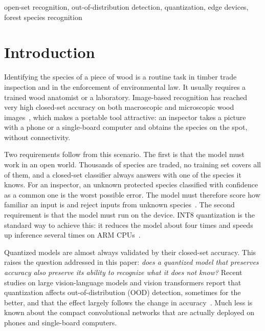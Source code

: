 \documentclass[conference]{IEEEtran}
\begin{document}
\begin{IEEEkeywords}
open-set recognition, out-of-distribution detection, quantization, edge devices, forest species recognition
\end{IEEEkeywords}

\section{Introduction}

Identifying the species of a piece of wood is a routine task in timber trade inspection and in the enforcement of environmental law. It usually requires a trained wood anatomist or a laboratory. Image-based recognition has reached very high closed-set accuracy on both macroscopic and microscopic wood images~\cite{martins2013database,paula2014forest,hafemann2014forest,ravindran2018meliaceae}, which makes a portable tool attractive: an inspector takes a picture with a phone or a single-board computer and obtains the species on the spot, without connectivity.

Two requirements follow from this scenario. The first is that the model must work in an open world. Thousands of species are traded, no training set covers all of them, and a closed-set classifier always answers with one of the species it knows. For an inspector, an unknown protected species classified with confidence as a common one is the worst possible error. The model must therefore score how familiar an input is and reject inputs from unknown species~\cite{scheirer2013open,bendale2015open,vaze2022open}. The second requirement is that the model must run on the device. INT8 quantization is the standard way to achieve this: it reduces the model about four times and speeds up inference several times on ARM CPUs~\cite{jacob2018quantization,krishnamoorthi2018quantizing}.

Quantized models are almost always validated by their closed-set accuracy. This raises the question addressed in this paper: \emph{does a quantized model that preserves accuracy also preserve its ability to recognize what it does not know?} Recent studies on large vision-language models and vision transformers report that quantization affects out-of-distribution (OOD) detection, sometimes for the better, and that the effect largely follows the change in accuracy~\cite{bouguerra2025less,kuang2026vit}. Much less is known about the compact convolutional networks that are actually deployed on phones and single-board computers.
\end{document}
